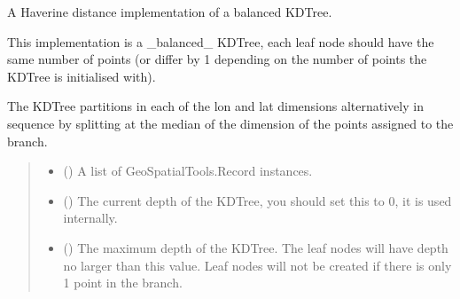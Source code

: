 \documentclass[letterpaper,10pt,english]{sphinxmanual}
\begin{document}
\begin{fulllineitems}
\label{\detokenize{users_guide:GeoSpatialTools.kdtree.KDTree}}
\pysigstartsignatures
\pysiglinewithargsret
{}
{\sphinxparamcomma {}\sphinxparamcomma {}}
{}
\pysigstopsignatures
\sphinxAtStartPar
A Haverine distance implementation of a balanced KDTree.

\sphinxAtStartPar
This implementation is a \_balanced\_ KDTree, each leaf node should have the
same number of points (or differ by 1 depending on the number of points
the KDTree is initialised with).

\sphinxAtStartPar
The KDTree partitions in each of the lon and lat dimensions alternatively
in sequence by splitting at the median of the dimension of the points
assigned to the branch.
\begin{quote}\begin{description}
\begin{itemize}
\item {} 
\sphinxAtStartPar
{} (\sphinxstyleliteralemphasis{\sphinxupquote{{[}}}{\hyperref[\detokenize{users_guide:GeoSpatialTools.quadtree.Record}]{\sphinxcrossref{\sphinxstyleliteralemphasis{\sphinxupquote{Record}}}}}\sphinxstyleliteralemphasis{\sphinxupquote{{]}}}) \textendash{} A list of GeoSpatialTools.Record instances.

\item {} 
\sphinxAtStartPar
{} () \textendash{} The current depth of the KDTree, you should set this to 0, it is used
internally.

\item {} 
\sphinxAtStartPar
{} () \textendash{} The maximum depth of the KDTree. The leaf nodes will have depth no
larger than this value. Leaf nodes will not be created if there is
only 1 point in the branch.

\end{itemize}


\end{description}
\end{quote}
\end{fulllineitems}
\end{document}
